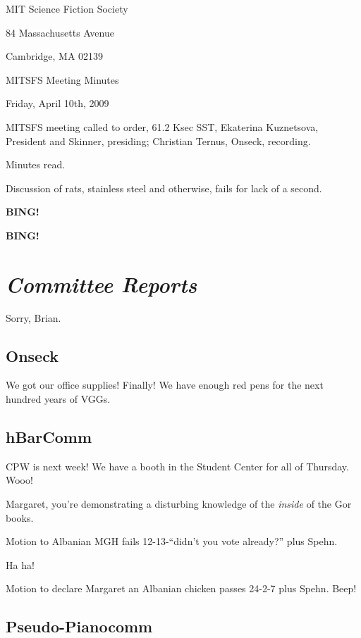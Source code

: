 \documentclass[10pt]{article}
\newcommand{\bing}{{\bf BING!} }
\newcommand{\goto}[1]{\bing \vskip 12pt \section*{{\em{#1}}}}
\newcommand{\ps}{ plus Spehn\xspace}
\begin{document}
\begin{center}

MIT Science Fiction Society

84 Massachusetts Avenue

Cambridge, MA 02139

\vspace{12pt}

MITSFS Meeting Minutes

Friday, April 10th, 2009

\end{center}

\vspace{18pt}

\setlength{\parskip}{6pt}

\noindent
MITSFS meeting called to order, 61.2 Ksec SST,
Ekaterina Kuznetsova, President and Skinner, presiding; Christian Ternus, Onseck, recording.

Minutes read.

Discussion of rats, stainless steel and otherwise, fails for lack of a second.  

\bing

\goto{Committee Reports}

Sorry, Brian.

\subsection*{Onseck}

We got our office supplies!  Finally!  We have enough red pens for the
next hundred years of VGGs.

\subsection*{hBarComm}

CPW is next week!  We have a booth in the Student Center for all of
Thursday.  Wooo!

Margaret, you're demonstrating a disturbing knowledge of the
\emph{inside} of the Gor books.

Motion to Albanian MGH fails 12-13-``didn't you vote already?''\ps.

Ha ha!

Motion to declare Margaret an Albanian chicken passes 24-2-7\ps.  Beep!

\subsection*{Pseudo-Pianocomm}
\end{document}
